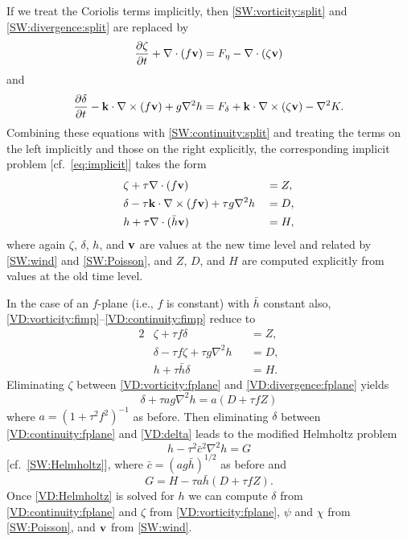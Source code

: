 \documentclass[12pt]{article}
\newcommand{\href}{\bar{h}}
\newcommand{\cbar}{\bar{c}}
\newcommand{\cross}{\times}
\newcommand{\del}{\nabla}
\newcommand{\laplacian}[1]{\del^2#1}
\begin{document}
If we treat the Coriolis terms implicitly, then \eqref{SW:vorticity:split} 
and \eqref{SW:divergence:split} are replaced by
\begin{equation}
   \frac{\partial \zeta}{\partial t} + \del\cdot(f\vecv) =
      \Feta - \del\cdot(\zeta\vecv)
\label{SW:vorticity:fsplit}
\end{equation}
and
\begin{equation}
   \frac{\partial \delta}{\partial t} - \veck\cdot\del\cross(f\vecv)
      + g\del^2 h = \Fdelta    + \veck\cdot\del\cross(\zeta\vecv) - \del^2 K.
\label{SW:divergence:fsplit}
\end{equation}
Combining these equations with \eqref{SW:continuity:split} and treating the
terms on the left implicitly and those on the right explicitly, the
corresponding implicit problem [cf.~\eqref{eq:implicit}] takes the form
\begin{alignat}{2}
   &\zeta + \tau\del\cdot(f\vecv) &&= Z,
\label{VD:vorticity:fimp}
\\
   &\delta - \tau\veck\cdot\del\cross(f\vecv) + \tau g\del^2 h &&= D,
\label{VD:divergence:fimp}
\\
  &h + \tau \del\cdot(\href\vecv) &&= H ,
\label{VD:continuity:fimp}
\end{alignat}
where again $\zeta$, $\delta$, $h$, and $\mathbf{v}$ are values at the new time
level and related by \eqref{SW:wind} and \eqref{SW:Poisson}, and $Z$, $D$, and
$H$ are computed explicitly from values at the old time level.  

In the case of an $f$-plane (i.e., $f$ is constant) with $\href$ constant
also, \eqref{VD:vorticity:fimp}--\eqref{VD:continuity:fimp} reduce to
\begin{alignat}{2}
   &\zeta + \tau f\delta &&= Z ,
\label{VD:vorticity:fplane}
\\
   &\delta - \tau f\zeta + \tau g\laplacian{h} &&= D ,
\label{VD:divergence:fplane}
\\
   &h + \tau\href\delta &&= H .
\label{VD:continuity:fplane}
\end{alignat}
Eliminating $\zeta$ between \eqref{VD:vorticity:fplane} and
\eqref{VD:divergence:fplane} yields
\begin{equation}
   \delta + \tau ag\laplacian{h} = a(D + \tau fZ)
\label{VD:delta}
\end{equation}
where $a = \left(1 + \tau^2 f^2\right)^{-1}$ as before.  Then
eliminating $\delta$ between \eqref{VD:continuity:fplane} and \eqref{VD:delta}
leads to the modified Helmholtz problem
\begin{equation}
   h - \tau^2\cbar^2\del^2 h = G 
\label{VD:Helmholtz}
\end{equation}
[cf.~\eqref{SW:Helmholtz}], where $\cbar = \left(ag\href\right)^{1/2}$
as before and
\begin{equation}
   G = H - \tau a\href(D + \tau fZ).
\end{equation}
Once \eqref{VD:Helmholtz} is solved for $h$ we can compute $\delta$ from
\eqref{VD:continuity:fplane} and $\zeta$ from \eqref{VD:vorticity:fplane}, 
$\psi$ and $\chi$ from \eqref{SW:Poisson}, and $\mathbf{v}$ from \eqref{SW:wind}.
\end{document}
